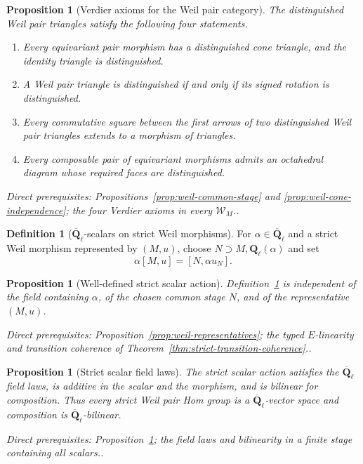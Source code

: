\documentclass[10pt]{article}
\newtheorem{proposition}[theorem]{Proposition}
\theoremstyle{definition}
\newtheorem{definition}[theorem]{Definition}
\newcommand{\Ql}{\mathbf Q_\ell}
\newcommand{\Qlb}{\overline{\mathbf Q}_\ell}
\newcommand{\depends}[1]{\par\smallskip\noindent\textit{Direct prerequisites:} #1.}
\begin{document}
\begin{proposition}[Verdier axioms for the Weil pair category]
\label{prop:weil-verdier-axioms}
The distinguished Weil pair triangles satisfy the following four
statements.
\begin{enumerate}
\item Every equivariant pair morphism has a distinguished cone triangle,
and the identity triangle is distinguished.
\item A Weil pair triangle is distinguished if and only if its signed
rotation is distinguished.
\item Every commutative square between the first arrows of two distinguished
Weil pair triangles extends to a morphism of triangles.
\item Every composable pair of equivariant morphisms admits an octahedral
diagram whose required faces are distinguished.
\end{enumerate}
\depends{Propositions~\ref{prop:weil-common-stage} and
\ref{prop:weil-cone-independence}; the four Verdier axioms in every
$\mathcal W_M$.}
\end{proposition}

\begin{definition}[$\Qlb$-scalars on strict Weil morphisms]
\label{def:weil-scalars}
For $\alpha\in\Qlb$ and a strict Weil morphism represented by $(M,u)$,
choose $N\supset M,\Ql(\alpha)$ and set
\[
 \alpha[M,u]=[N,\alpha u_N].
\]
\end{definition}

\begin{proposition}[Well-defined strict scalar action]
\label{prop:weil-scalars-well-defined}
Definition~\ref{def:weil-scalars} is independent of the field containing
$\alpha$, of the chosen common stage $N$, and of the representative
$(M,u)$.
\depends{Proposition~\ref{prop:weil-representatives}; the typed
$E$-linearity and transition coherence of
Theorem~\ref{thm:strict-transition-coherence}.}
\end{proposition}

\begin{proposition}[Strict scalar field laws]
\label{prop:weil-scalar-laws}
The strict scalar action satisfies the $\Qlb$ field laws, is additive in
the scalar and the morphism, and is bilinear for composition.  Thus every
strict Weil pair Hom group is a $\Qlb$-vector space and composition is
$\Qlb$-bilinear.
\depends{Proposition~\ref{prop:weil-scalars-well-defined}; the field laws
and bilinearity in a finite stage containing all scalars.}
\end{proposition}
\end{document}
